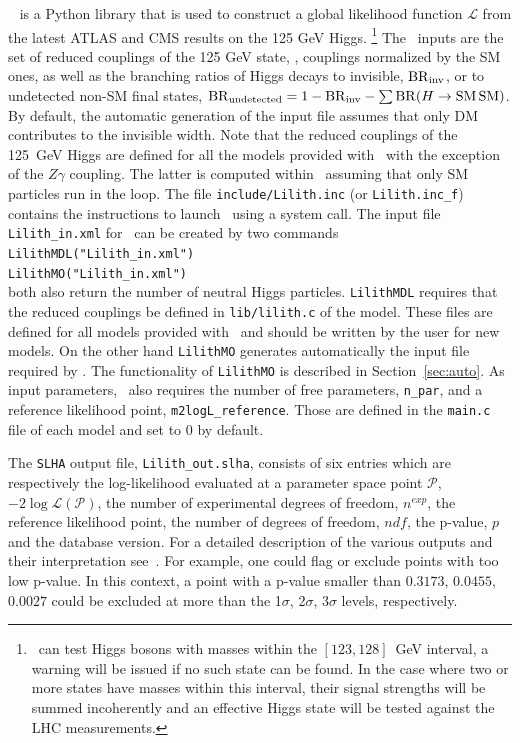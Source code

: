 \documentclass[12pt,a4paper]{article}
\begin{document}
\lilith~\cite{Bernon:2015hsa,Kraml:2019sis,Bertrand:2020lyb} is a Python library that is used to construct a global likelihood function $\mathcal{L}$  from the latest ATLAS and CMS results on the 125 GeV Higgs.%
\footnote{\lilith\ can test Higgs bosons with masses within the $[123, 128]$~GeV interval, a warning will be issued if no such state can be found. In the case where two or more states have masses within this interval, their signal strengths will be summed incoherently and an effective Higgs state will be tested against the LHC measurements.}
The \lilith\ inputs are the set of reduced couplings of the 125 GeV state, \ie, couplings normalized by the SM ones, as well as the  branching ratios of Higgs decays to invisible, ${\rm BR}_{\rm inv}$, or to undetected non-SM final states,
${\rm BR}_{\rm undetected}=1-{\rm BR}_{\rm inv}-\sum {\rm BR}(H\rightarrow {\rm SM \,SM})$. 
By default, the automatic generation of the input file assumes that only DM contributes to the invisible width. 
Note that the reduced couplings of the 125~GeV Higgs are defined for all the models provided with \micro\ with the exception of the $Z\gamma$ coupling. The latter is computed within \lilith\ assuming that only SM particles run in the loop. 
The file \verb|include/Lilith.inc| (or \verb|Lilith.inc_f|) contains the instructions to launch \lilith\ using a system call. 
The input file  \verb|Lilith_in.xml| for \lilith\ can be created by two  commands\\

\noindent
\verb|LilithMDL("Lilith_in.xml")|\\
\verb|LilithMO("Lilith_in.xml")|\\

\noindent 
both also return the number of neutral Higgs particles.  
\verb|LilithMDL| requires that the  reduced couplings be defined in \verb|lib/lilith.c| of the model. These files are defined for all models provided with \micro\ and should be written by the user for new models. On the other hand \verb|LilithMO|  generates automatically the input file required by \lilith.
The functionality of \verb|LilithMO| is described in Section~\ref{sec:auto}. As input parameters, \lilith\ also requires 
 the number of free parameters, \verb|n_par|, and  a reference likelihood point, \verb|m2logL_reference|. Those are defined in the \verb|main.c| file of each model and set to 0 by default.

The {\tt SLHA} output file, \verb|Lilith_out.slha|, consists of six entries which are respectively the log-likelihood evaluated at a parameter space point $\mathcal{P}$, $-2\log\mathcal{L}(\mathcal{P})$, the number of experimental degrees of freedom, $n^{exp}$, the reference likelihood point,  the number of degrees of freedom, $ndf$, the p-value, $p$ and the database version.
For a detailed description of the various outputs and their interpretation see~\cite{Bernon:2015hsa,Kraml:2019sis}. For example, one could flag or exclude points with too low p-value. In this context, a point with a p-value smaller than $0.3173$, $0.0455$, $0.0027$ could be excluded at more than the 1$\sigma$, 2$\sigma$, 3$\sigma$ levels, respectively.
\end{document}

